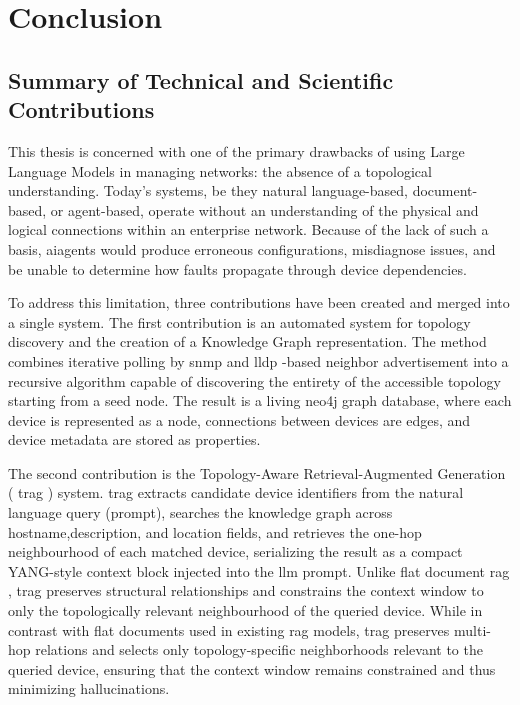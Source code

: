 \documentclass[11pt,a4paper]{report}
\begin{document}
\chapter{Conclusion}

\section{Summary of Technical and Scientific Contributions}

This thesis is concerned with one of the primary drawbacks of using Large Language Models in managing networks: the absence of a topological understanding. Today's systems, be they natural language-based, document-based, or agent-based, operate without an understanding of the physical and logical connections within an enterprise network. Because of the lack of such a basis, \gls{ai}agents would produce erroneous configurations, misdiagnose issues, and be unable to determine how faults propagate through device dependencies.

To address this limitation, three contributions have been created and merged into a single system. The first contribution is an automated system for topology discovery and the creation of a Knowledge Graph representation. The method combines iterative polling by \gls{snmp} and \gls{lldp} -based neighbor advertisement into a recursive algorithm capable of discovering the entirety of the accessible topology starting from a seed node. The result is a living  \gls{neo4j}  graph database, where each device is represented as a node, connections between devices are edges, and device metadata are stored as properties.

The second contribution is the Topology-Aware Retrieval-Augmented Generation ( \gls{trag} ) system.  \gls{trag}  extracts candidate device identifiers from the natural language query (prompt), searches the knowledge graph across hostname,description, and location fields, and retrieves the one-hop neighbourhood of each matched device, serializing the result as a compact YANG-style context block injected into the \gls{llm}  prompt. Unlike flat document  \gls{rag} ,  \gls{trag}  preserves structural relationships and constrains the context window to only the topologically relevant neighbourhood of the queried device. While in contrast with flat documents used in existing  \gls{rag}  models,  \gls{trag}  preserves multi-hop relations and selects only topology-specific neighborhoods relevant to the queried device, ensuring that the context window remains constrained and thus minimizing \gls{hallucination}s.
\end{document}
